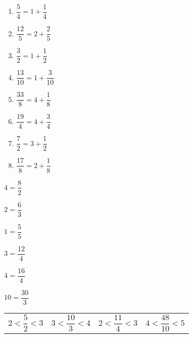 \exo{}

\begin{multicols}{2}
\begin{enumerate}[itemsep=2em]
	\item $ \dfrac{5}{4} = 1+\dfrac{1}{4} $
	\item $ \dfrac{12}{5} = 2+\dfrac{2}{5} $
	\item $ \dfrac{3}{2} = 1+\dfrac{1}{2} $
	\item $ \dfrac{13}{10} = 1+\dfrac{3}{10} $
	\item $ \dfrac{33}{8} = 4+\dfrac{1}{8} $
	\item $ \dfrac{19}{4} = 4+\dfrac{3}{4} $
	\item $ \dfrac{7}{2} = 3+\dfrac{1}{2} $
	\item $ \dfrac{17}{8} = 2+\dfrac{1}{8} $
\end{enumerate}
\end{multicols}


\begin{multicols}{3}
\begin{description}[itemsep=2em]
	\item $4= \dfrac{8}{2}$
	\item $2= \dfrac{6}{3}$
	\item $1= \dfrac{5}{5}$
	\item $3= \dfrac{12}{4}$
	\item $4= \dfrac{16}{4}$
	\item $10= \dfrac{30}{3}$
\end{description}
\end{multicols}


\begin{tabularx}{\linewidth}{*{4}{X}}
	 $2<\dfrac{5}{2}<3$
	&$3<\dfrac{10}{3}<4$
	&$2<\dfrac{11}{4}<3$	
	&$4<\dfrac{48}{10}<5$\\		
\end{tabularx}